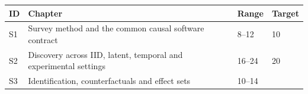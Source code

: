 \documentclass[
  11pt,
  a4paper,
]{article}
\begin{document}
\begin{longtable}[]{@{}llll@{}}
\toprule
\begin{minipage}[b]{0.22\columnwidth}\raggedright
ID\strut
\end{minipage} & \begin{minipage}[b]{0.22\columnwidth}\raggedright
Chapter\strut
\end{minipage} & \begin{minipage}[b]{0.22\columnwidth}\raggedright
Range\strut
\end{minipage} & \begin{minipage}[b]{0.22\columnwidth}\raggedright
Target\strut
\end{minipage}\tabularnewline
\midrule
\endhead
\begin{minipage}[t]{0.22\columnwidth}\raggedright
S1\strut
\end{minipage} & \begin{minipage}[t]{0.22\columnwidth}\raggedright
Survey method and the common causal software contract\strut
\end{minipage} & \begin{minipage}[t]{0.22\columnwidth}\raggedright
8--12\strut
\end{minipage} & \begin{minipage}[t]{0.22\columnwidth}\raggedright
10\strut
\end{minipage}\tabularnewline
\begin{minipage}[t]{0.22\columnwidth}\raggedright
S2\strut
\end{minipage} & \begin{minipage}[t]{0.22\columnwidth}\raggedright
Discovery across IID, latent, temporal and experimental settings\strut
\end{minipage} & \begin{minipage}[t]{0.22\columnwidth}\raggedright
16--24\strut
\end{minipage} & \begin{minipage}[t]{0.22\columnwidth}\raggedright
20\strut
\end{minipage}\tabularnewline
\begin{minipage}[t]{0.22\columnwidth}\raggedright
S3\strut
\end{minipage} & \begin{minipage}[t]{0.22\columnwidth}\raggedright
Identification, counterfactuals and effect sets\strut
\end{minipage} & \begin{minipage}[t]{0.22\columnwidth}\raggedright
10--14\strut

\end{minipage}
\end{longtable}
\end{document}
